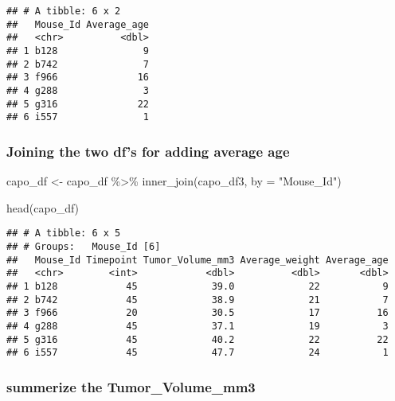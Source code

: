 \documentclass[
]{article}
\newenvironment{Shaded}{\begin{snugshade}}{\end{snugshade}}
\newcommand{\AttributeTok}[1]{\textcolor[rgb]{0.77,0.63,0.00}{#1}}
\newcommand{\FunctionTok}[1]{\textcolor[rgb]{0.00,0.00,0.00}{#1}}
\newcommand{\NormalTok}[1]{#1}
\newcommand{\OtherTok}[1]{\textcolor[rgb]{0.56,0.35,0.01}{#1}}
\newcommand{\SpecialCharTok}[1]{\textcolor[rgb]{0.00,0.00,0.00}{#1}}
\newcommand{\StringTok}[1]{\textcolor[rgb]{0.31,0.60,0.02}{#1}}
\begin{document}
\begin{verbatim}
## # A tibble: 6 x 2
##   Mouse_Id Average_age
##   <chr>          <dbl>
## 1 b128               9
## 2 b742               7
## 3 f966              16
## 4 g288               3
## 5 g316              22
## 6 i557               1
\end{verbatim}

\hypertarget{joining-the-two-dfs-for-adding-average-age}{%
\subsubsection{Joining the two df's for adding average
age}\label{joining-the-two-dfs-for-adding-average-age}}

\begin{Shaded}
\begin{Highlighting}[]
\NormalTok{capo\_df }\OtherTok{\textless{}{-}}\NormalTok{ capo\_df }\SpecialCharTok{\%\textgreater{}\%} \FunctionTok{inner\_join}\NormalTok{(capo\_df3, }\AttributeTok{by =} \StringTok{"Mouse\_Id"}\NormalTok{)}

\FunctionTok{head}\NormalTok{(capo\_df)}
\end{Highlighting}
\end{Shaded}

\begin{verbatim}
## # A tibble: 6 x 5
## # Groups:   Mouse_Id [6]
##   Mouse_Id Timepoint Tumor_Volume_mm3 Average_weight Average_age
##   <chr>        <int>            <dbl>          <dbl>       <dbl>
## 1 b128            45             39.0             22           9
## 2 b742            45             38.9             21           7
## 3 f966            20             30.5             17          16
## 4 g288            45             37.1             19           3
## 5 g316            45             40.2             22          22
## 6 i557            45             47.7             24           1
\end{verbatim}

\hypertarget{summerize-the-tumor_volume_mm3}{%
\subsubsection{summerize the
Tumor\_Volume\_mm3}\label{summerize-the-tumor_volume_mm3}}

\begin{Shaded}
\end{Shaded}
\end{document}
